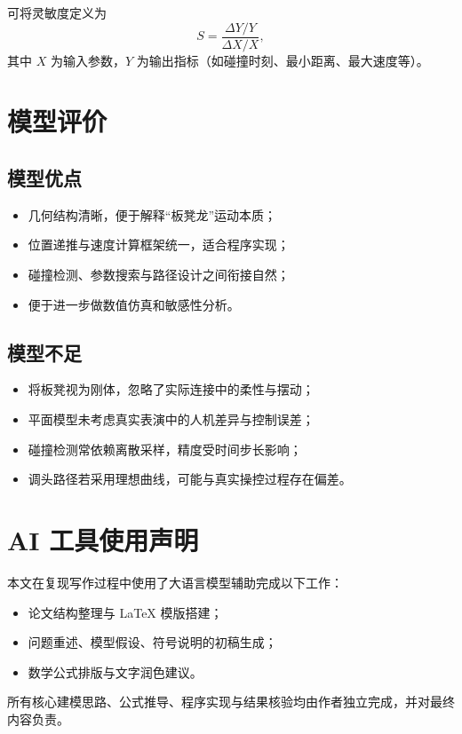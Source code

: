 \documentclass[12pt,a4paper]{ctexart}
\begin{document}
可将灵敏度定义为
\begin{equation}
S=\frac{\Delta Y / Y}{\Delta X / X},
\end{equation}
其中 $X$ 为输入参数，$Y$ 为输出指标（如碰撞时刻、最小距离、最大速度等）。

\section{模型评价}

\subsection{模型优点}
\begin{itemize}[leftmargin=2em]
    \item 几何结构清晰，便于解释“板凳龙”运动本质；
    \item 位置递推与速度计算框架统一，适合程序实现；
    \item 碰撞检测、参数搜索与路径设计之间衔接自然；
    \item 便于进一步做数值仿真和敏感性分析。
\end{itemize}

\subsection{模型不足}
\begin{itemize}[leftmargin=2em]
    \item 将板凳视为刚体，忽略了实际连接中的柔性与摆动；
    \item 平面模型未考虑真实表演中的人机差异与控制误差；
    \item 碰撞检测常依赖离散采样，精度受时间步长影响；
    \item 调头路径若采用理想曲线，可能与真实操控过程存在偏差。
\end{itemize}

\section{AI 工具使用声明}
本文在复现写作过程中使用了大语言模型辅助完成以下工作：
\begin{itemize}[leftmargin=2em]
    \item 论文结构整理与 LaTeX 模版搭建；
    \item 问题重述、模型假设、符号说明的初稿生成；
    \item 数学公式排版与文字润色建议。
\end{itemize}
所有核心建模思路、公式推导、程序实现与结果核验均由作者独立完成，并对最终内容负责。
\end{document}
